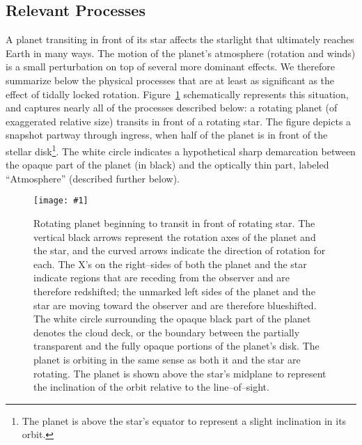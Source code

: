 \documentclass[12pt,preprint]{aastex}
\def\plotone#1{\centering \leavevmode
\texttt{[image: \#1]}}
\begin{document}
\subsection{Relevant Processes}
\label{ssec:processes}
A planet transiting in front of its star affects the starlight that ultimately
reaches Earth in many ways.  The motion of the planet's atmosphere
(rotation and winds) is a small perturbation on top of several more
dominant effects.  We therefore summarize below the physical processes
that are at least as significant as the effect of tidally locked rotation.
Figure~\ref{fig:schematic} schematically represents this situation, and
captures nearly all of the processes described below:
a rotating planet (of exaggerated relative size) transits in front of a
rotating star.  The figure depicts a snapshot partway through ingress, when
half of the planet is in front of the stellar disk\footnote{The planet is
above the star's equator to represent a slight inclination in its orbit.}.
The white circle indicates a hypothetical sharp demarcation between the opaque
part of the planet (in black) and the optically thin part, labeled
``Atmosphere'' (described further below).
\begin{figure}[h!]
\plotone
{fig1.eps}
\caption{Rotating planet beginning to transit in front of rotating star.
The vertical black arrows represent the rotation axes of the planet and the
star, and the curved arrows indicate the direction of rotation for each.
The X's on the right--sides of both the planet and the star indicate regions
that are receding from the observer and are therefore redshifted;
the unmarked left sides of the planet and the star are moving toward the
observer and are therefore blueshifted.
The white circle surrounding the opaque black part of the planet denotes
the cloud deck, or the boundary between the partially transparent and the
fully opaque portions of the planet's disk.  The planet is orbiting in the
same sense as both it and the star are rotating.  The planet is shown above
the star's midplane to represent the inclination of the orbit relative to
the line--of--sight.}
\label{fig:schematic}
\end{figure}
\end{document}
